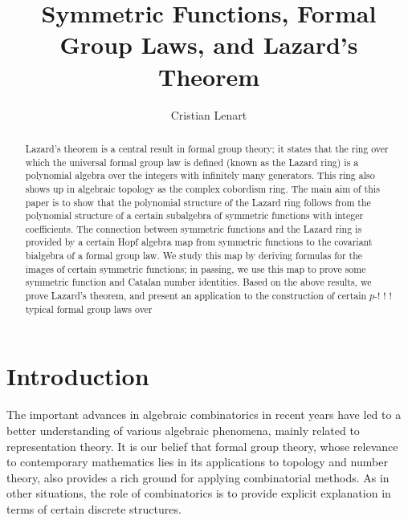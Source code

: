\documentclass[a4paper,12pt]{amsart}
\theoremstyle{definition}
\numberwithin{equation}{section}
\begin{document}

\title[Symmetric Functions and Formal Group Laws]{Symmetric Functions, Formal Group Laws, and Lazard's Theorem}
\author{Cristian Lenart}
\address{Department of Mathematics, Massachusetts Institute of Technology, Cambridge, MA 02139-4307, U.S.A.}  


\begin{abstract}
Lazard's theorem is a central result in formal group theory; it states that the ring over which the universal formal group law is defined (known as the Lazard ring) is a polynomial algebra over the integers with infinitely many generators. This ring also shows up in algebraic topology as the complex cobordism ring. The main aim of this paper is to show that the polynomial structure of the Lazard ring follows from the polynomial structure of a certain subalgebra of symmetric functions with integer coefficients. The connection between symmetric functions and the Lazard ring is provided by a certain Hopf algebra map from symmetric functions to the covariant bialgebra of a formal group law. We study this map by deriving formulas for the images of certain symmetric functions; in passing, we use this map to prove some symmetric function and Catalan number identities. Based on the above results, we prove Lazard's theorem, and present an application to the construction of certain $p$-!
!
!
typical formal group laws over 
\end{abstract}

\maketitle

\section{Introduction}

The important advances in algebraic combinatorics in recent years have led to a better understanding of various algebraic phenomena, mainly related to representation theory. It is our belief that formal group theory, whose relevance to contemporary mathematics lies in its applications to topology and number theory, also provides a rich ground for applying combinatorial methods. As in other situations, the role of combinatorics is to provide explicit explanation in terms of certain discrete structures.  
\end{document}
